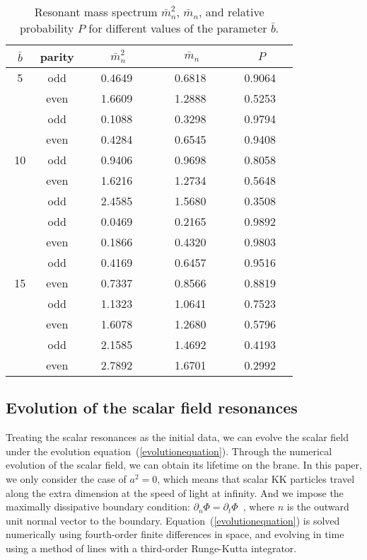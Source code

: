 \begin{table*}[htbp]
\begin{center}
\begin{tabular}{| c |c| c| c| c |}
\hline
$\;\;\bar{b}\;\;$  &
\;\;\;\;\;\;\;\;parity\;\;\;\;\;\;\; &
$\;\;\;\;\;\;\;\;\bar{m}_{n}^{2}\;\;\;\;\;\;\;$ &
$\;\;\;\;\;\;\;\;\bar{m}_{n}\;\;\;\;\;\;\;$ &
$\;\;\;\;\;\;\;\;P\;\;\;\;\;\;\;$\\
\hline
5      &odd   &  0.4649 & 0.6818  & 0.9064 \\
      &even  &  1.6609 & 1.2888  & 0.5253 \\
\hline
      &odd   &  0.1088 & 0.3298  & 0.9794 \\
      &even  &  0.4284 & 0.6545& 0.9408 \\
10      &odd   &  0.9406 & 0.9698  & 0.8058 \\
      &even  &  1.6216 & 1.2734  & 0.5648 \\
      &odd   &  2.4585 & 1.5680  & 0.3508 \\
\hline
      &odd   &  0.0469 & 0.2165  & 0.9892 \\
      &even  &  0.1866 & 0.4320  & 0.9803 \\
      &odd   &  0.4169 & 0.6457  & 0.9516 \\
15      &even  &  0.7337 & 0.8566  & 0.8819 \\
     &odd   &  1.1323 & 1.0641  & 0.7523 \\
      &even  &  1.6078 & 1.2680  & 0.5796 \\
      &odd   &  2.1585 & 1.4692  & 0.4193 \\
      &even  &  2.7892 & 1.6701  & 0.2992 \\
\hline
\end{tabular}
\end{center}
\caption{Resonant mass spectrum $\bar{m}_{n}^{2}$, $\bar{m}_{n}$, and relative probability $P$ for different values of the parameter $\bar{b}$. \label{tab1}}
\end{table*}



\subsection{Evolution of the scalar field resonances}
Treating the scalar resonances as the initial data, we can evolve the scalar field under the evolution equation~(\ref{evolutionequation}). Through the numerical evolution of the scalar field, we can obtain its lifetime on the brane. In this paper, we only consider the case of $a^2=0$, which means that scalar KK particles travel along the extra dimension at the speed of light at infinity. And we impose the maximally dissipative boundary condition: $\partial_{n}\Phi=\partial_{t}\Phi$~\cite{Megevand:2007uy}, where $n$ is the outward unit normal vector to the boundary. Equation~(\ref{evolutionequation}) is solved numerically using fourth-order finite differences in space, and evolving in time using a method of lines with a third-order Runge-Kutta integrator.

